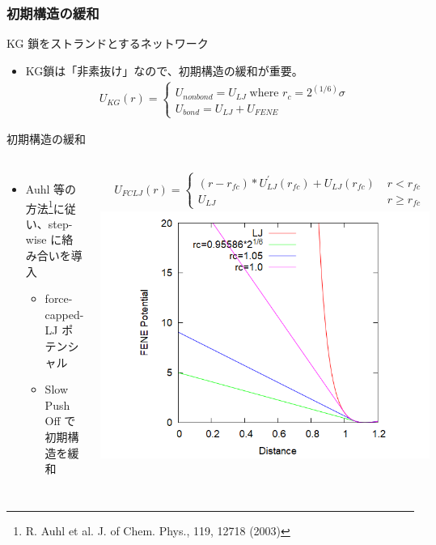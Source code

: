 \documentclass[aspectratio=169,11pt, dvipdfmx]{beamer}
\begin{document}
\begin{frame}
    \frametitle{初期構造の緩和}
        \vspace{-2mm}
		\begin{block}{KG 鎖をストランドとするネットワーク}
			\begin{itemize}
				\item KG鎖は「非素抜け」なので、\alert{初期構造の緩和}が重要。
					\fontsize{6pt}{0pt}
					\begin{align*}
						&U_{KG}(r) = 
						\begin{cases}
						U_{nonbond} = U_{LJ} \;\text{where } r_c = 2^{(1/6)}\sigma \\
						U_{bond} = U_{LJ} + U_{FENE}
						\end{cases} 
					\end{align*}
			\end{itemize}
		\end{block}
        \begin{exampleblock}{初期構造の緩和}
            \begin{columns}[T, onlytextwidth]
					\begin{itemize}
						\item Auhl 等の方法\footnote{
							\scriptsize{R. Auhl et al. J. of Chem. Phys., 119, 12718 (2003)}
                        }に従い、step-wise に絡み合いを導入
						\begin{itemize}
							\item force-capped-LJ ポテンシャル
							\item Slow Push Off で初期構造を緩和
						\end{itemize}
					\end{itemize}
					\fontsize{6pt}{0pt}
					\begin{align*}
						&U_{FCLJ}(r) = 
						\begin{cases}
						(r-r_{fc})*U_{LJ}^{\prime}(r_{fc}) + U_{LJ}(r_{fc}) \; &r< r_{fc} \\
						U_{LJ}   \;\;\;\;\;\;\; &r \geq r_{fc}
						\end{cases} 
					\end{align*}
				\vspace{3mm}
				\centering
					\includegraphics[width=\textwidth]{Ev_fcLJ.png}

\end{columns}
\end{exampleblock}
\end{frame}
\end{document}
